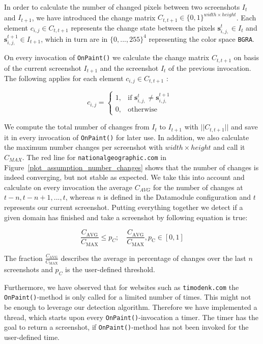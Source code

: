 In order to calculate the number of changed pixels between two screenshots $I_{t}$ and $I_{t+1}$, we have introduced the change matrix $C_{t,t+1} \in \{0,1\}^{width\times height}$. Each element $c_{i,j} \in C_{t,t+1}$ represents the change state between the pixels $\mathbf{s}^{t}_{i,j,} \in I_{t}$ and $\mathbf{s}^{t+1}_{i,j,}  \in I_{t+1}$, which in turn are in $\{0, ... , 255\}^{4}$ representing the color space \texttt{BGRA}.

On every invocation of \texttt{OnPaint()} we calculate the change matrix $C_{t,t+1}$ on basis of the current screenshot $I_{t+1}$ and the screenshot $I_{t}$ of the previous invocation. The following applies for each element $c_{i,j} \in C_{t,t+1}$ :

\[
c_{i,j} =
\begin{cases}
1,& \text{if $\mathbf{s}^{t}_{i,j,} \neq \mathbf{s}^{t+1}_{i,j,}$ } \\
0,              & \text{otherwise}
\end{cases}
\]

We compute the total number of changes from $I_{t}$ to $I_{t+1}$ with $|| C_{t,t+1}||$ and save it in every invocation of \texttt{OnPaint()} for later use. In addition, we also calculate the maximum number changes per screenshot with $width \times height$ and call it $C_{MAX}$. The red line for \texttt{nationalgeographic.com} in Figure~\ref{plot_assumption_number_changes} shows that the number of changes is indeed converging, but not stable as expected. We take this into account and calculate on every invocation the average $C_{AVG}$ for the number of changes at $t-n, t-n+1, ..., t$, whereas $n$ is defined in the Datamodule configuration and $t$ represents our current screenshot. Putting everything together we detect if a given domain has finished and take a screenshot by following equation is true:

\[
{\frac{C_{\text{AVG}}}{C_{\text{MAX}}} \leq p_{C}; \quad   {\frac{C_{\text{AVG}}}{C_{\text{MAX}}}}, p_{\text{C}} \in [0,1]}
\]

The fraction ${\frac{C_{\text{AVG}}}{C_{\text{MAX}}}}$ describes the average in percentage of changes over the last $n$ screenshots and $p_{C}$ is the user-defined threshold. 

Furthermore, we have observed that for websites such as \texttt{timodenk.com} the \texttt{OnPaint()}-method is only called for a limited number of times. This might not be enough to leverage our detection algorithm. Therefore we have implemented a thread, which starts upon every \texttt{OnPaint()}-invocation a timer. The timer has the goal to return a screenshot, if \texttt{OnPaint()}-method has not been invoked for the user-defined time.  


